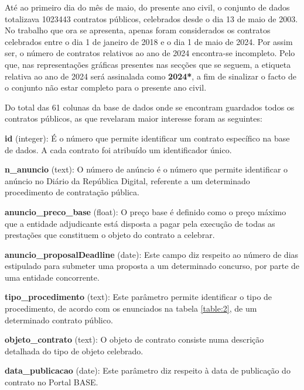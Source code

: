 Até ao primeiro dia do mês de maio, do presente ano civil, o conjunto de dados totalizava 1023443 contratos públicos, celebrados desde o dia 13 de maio de 2003. No trabalho que ora se apresenta, apenas foram considerados os contratos celebrados entre o dia 1 de janeiro de 2018 e o dia 1 de maio de 2024. Por assim ser, o número de contratos relativos ao ano de 2024 encontra-se incompleto. Pelo que, nas representações gráficas presentes nas secções que se seguem, a etiqueta relativa ao ano de 2024 será assinalada como \textbf{2024*}, a fim de sinalizar o facto de o conjunto não estar completo para o presente ano civil. 

Do total das 61 colunas da base de dados onde se encontram guardados todos os contratos públicos, as que revelaram maior interesse foram as seguintes: 


\begin{my_itemize}
	

\item \textbf{id} (integer): É o número que permite identificar um contrato específico na base de dados. A cada contrato foi atribuído um identificador único.


\item \textbf{n\_anuncio} (text): O número de anúncio é o número que permite identificar o anúncio no Diário da República Digital, referente a um determinado procedimento de contratação pública.


\item \textbf{anuncio\_preco\_base} (float): O preço base é definido como o preço máximo que a entidade adjudicante está disposta a pagar pela execução de todas as prestações que constituem o objeto do contrato a celebrar.


\item \textbf{anuncio\_proposalDeadline} (date): Este campo diz respeito ao número de dias estipulado para submeter uma proposta a um determinado concurso, por parte de uma entidade concorrente. 


\item \textbf{tipo\_procedimento} (text): Este parâmetro permite identificar o tipo de procedimento, de acordo com os enunciados na tabela \ref{table:2}, de um  determinado contrato público.


\item \textbf{objeto\_contrato} (text): O objeto de contrato consiste numa descrição detalhada do tipo de objeto celebrado. 


\item \textbf{data\_publicacao} (date): Este parâmetro diz respeito à data de publicação do contrato no Portal BASE.



\end{my_itemize}
